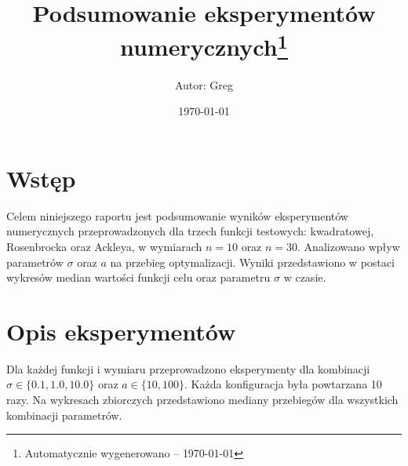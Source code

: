 \documentclass[a4paper,12pt]{article}
\title{Podsumowanie eksperymentów numerycznych\thanks{Automatycznie wygenerowano -- {\today}}}
\author{Autor: Greg}
\date{\today}
\begin{document}
\maketitle
\tableofcontents
\newpage

\section{Wstęp}
Celem niniejszego raportu jest podsumowanie wyników eksperymentów numerycznych przeprowadzonych dla trzech funkcji testowych: kwadratowej, Rosenbrocka oraz Ackleya, w wymiarach $n=10$ oraz $n=30$. Analizowano wpływ parametrów $\sigma$ oraz $a$ na przebieg optymalizacji. Wyniki przedstawiono w postaci wykresów median wartości funkcji celu oraz parametru $\sigma$ w czasie.

\section{Opis eksperymentów}
Dla każdej funkcji i wymiaru przeprowadzono eksperymenty dla kombinacji $\sigma \in \{0.1, 1.0, 10.0\}$ oraz $a \in \{10, 100\}$. Każda konfiguracja była powtarzana 10 razy. Na wykresach zbiorczych przedstawiono mediany przebiegów dla wszystkich kombinacji parametrów.

\end{document}
